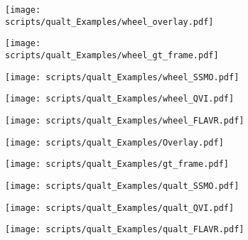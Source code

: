 \documentclass[10pt,twocolumn,letterpaper]{article}
\begin{document}
\begin{figure}[t]
    \begin{center}
    \begin{subfigure}[b]{0.09\textwidth}
        \centering
        \texttt{[image: scripts/qualt\_Examples/wheel\_overlay.pdf]}
    \end{subfigure}
    \hfill
    \begin{subfigure}[b]{0.09\textwidth}
        \centering
        \texttt{[image: scripts/qualt\_Examples/wheel\_gt\_frame.pdf]}
    \end{subfigure}
    \hfill
    \begin{subfigure}[b]{0.09\textwidth}
        \centering
        \texttt{[image: scripts/qualt\_Examples/wheel\_SSMO.pdf]}
    \end{subfigure}
    \hfill
    \begin{subfigure}[b]{0.09\textwidth}
        \centering
        \texttt{[image: scripts/qualt\_Examples/wheel\_QVI.pdf]}
    \end{subfigure}
    \hfill
    \begin{subfigure}[b]{0.09\textwidth}
        \centering
        \texttt{[image: scripts/qualt\_Examples/wheel\_FLAVR.pdf]}
    \end{subfigure}
    


    \begin{subfigure}[b]{0.09\textwidth}
        \centering
        \texttt{[image: scripts/qualt\_Examples/Overlay.pdf]}
    \end{subfigure}
    \hfill
    \begin{subfigure}[b]{0.09\textwidth}
        \centering
        \texttt{[image: scripts/qualt\_Examples/gt\_frame.pdf]}
    \end{subfigure}
    \hfill
    \begin{subfigure}[b]{0.09\textwidth}
        \centering
        \texttt{[image: scripts/qualt\_Examples/qualt\_SSMO.pdf]}
    \end{subfigure}
    \hfill
    \begin{subfigure}[b]{0.09\textwidth}
        \centering
        \texttt{[image: scripts/qualt\_Examples/qualt\_QVI.pdf]}
    \end{subfigure}
    \hfill
    \begin{subfigure}[b]{0.09\textwidth}
        \centering
        \texttt{[image: scripts/qualt\_Examples/qualt\_FLAVR.pdf]}
    \end{subfigure}
    



\end{center}
\end{figure}
\end{document}
